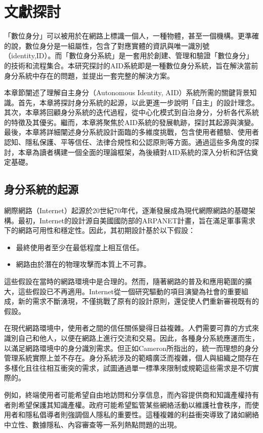 
\chapter{文獻探討}
「數位身分」可以被用於在網路上標識一個人，一種物體，甚至一個機構。更準確的說，數位身分是一組屬性，包含了對應實體的資訊與唯一識別號（identity,ID）。而「數位身分系統」是一套用於創建、管理和驗證「數位身分」的技術和流程集合。本研究探討的AID系統即是一種數位身分系統，旨在解決當前身分系統中存在的問題，並提出一套完整的解決方案。

本章節闡述了理解自主身分（Autonomous Identity, AID）系統所需的關鍵背景知識。首先，本章將探討身分系統的起源，以此更進一步說明「自主」的設計理念。其次，本章將回顧身分系統的迭代過程，從中心化模式到自治身分，分析各代系統的特徵及其優劣。繼而，本章將聚焦於AID系統的發展軌跡，探討其起源與演變。最後，本章將詳細闡述身分系統設計面臨的多維度挑戰，包含使用者體驗、使用者認知、隱私保護、平等信任、法律合規性和公認原則等方面。通過這些多角度的探討，本章為讀者構建一個全面的理論框架，為後續對AID系統的深入分析和評估奠定基礎。
\section{身分系統的起源}
網際網路（Internet）起源於20世紀70年代，逐漸發展成為現代網際網路的基礎架構。最初，Internet的設計源自美國國防部的ARPANET計畫，旨在滿足軍事需求下的網路可用性和穩定性。因此，其初期設計基於以下假設\cite{Pekka2010HIP}：
\begin{itemize}
  \item 最終使用者至少在最低程度上相互信任。
  \item 網路由於潛在的物理攻擊而本質上不可靠。
\end{itemize}
這些假設在當時的網路環境中是合理的。然而，隨著網路的普及和應用範圍的擴大，這些假設已不再適用\cite{tomorrowinternet}。Internet從一個研究驅動的項目演變為社會的重要組成，新的需求不斷湧現，不僅挑戰了原有的設計原則，還促使人們重新審視既有的假設。

在現代網路環境中，使用者之間的信任關係變得日益複雜。人們需要可靠的方式來識別自己和他人，以便在網路上進行交流和交易。因此，各種身分系統應運而生，以滿足網路環境中的身分識別需求。但正如Cameron\cite{cameron2005laws}所指出的，統一而理想的身分管理系統實際上並不存在。身分系統涉及的範疇廣泛而複雜，個人與組織之間存在多樣化且往往相互衝突的需求，試圖通過單一標準來限制或規範這些需求是不切實際的。

例如，終端使用者可能希望自由地訪問和分享信息，而內容提供商和知識產權持有者則希望保護其知識產權。政府可能希望監管某些網絡活動以維護社會秩序，而使用者和隱私倡導者則強調個人隱私的重要性。這種複雜的利益衝突導致了諸如網絡中立性、數據隱私、內容審查等一系列熱點問題的出現\cite{Wu2003NetworkNeutrality}。

